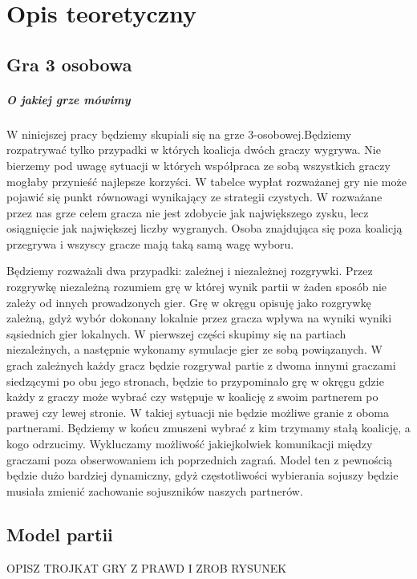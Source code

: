 \chapter{Opis teoretyczny}
\label{cha:opis_teor}

\section{Gra 3 osobowa}
\label{sec:3_gra}

\paragraph{O jakiej grze mówimy}

W niniejszej pracy będziemy skupiali się na grze 3-osobowej.Będziemy rozpatrywać tylko przypadki w których koalicja dwóch graczy wygrywa. Nie bierzemy pod uwagę sytuacji w których współpraca ze sobą wszystkich graczy mogłaby przynieść najlepsze korzyści. W tabelce wypłat rozważanej gry nie może pojawić się punkt równowagi wynikający ze strategii czystych. W rozważane przez nas grze celem gracza nie jest zdobycie jak największego zysku, lecz osiągnięcie jak największej liczby wygranych. Osoba znajdująca się poza koalicją przegrywa i wszyscy gracze mają taką samą wagę wyboru.

Będziemy rozważali dwa przypadki: zależnej i niezależnej rozgrywki. Przez rozgrywkę niezależną rozumiem grę w której wynik partii w żaden sposób nie zależy od innych prowadzonych gier. Grę w okręgu opisuję jako rozgrywkę zależną, gdyż wybór dokonany lokalnie przez gracza wpływa na wyniki wyniki sąsiednich gier lokalnych. W pierwszej części skupimy się na partiach niezależnych, a następnie wykonamy symulacje gier ze sobą powiązanych. W grach zależnych każdy gracz będzie rozgrywał partie z dwoma innymi graczami siedzącymi po obu jego stronach, będzie to przypominało grę w okręgu gdzie każdy z graczy może wybrać czy wstępuje w koalicję z swoim partnerem po prawej czy lewej stronie. W takiej sytuacji nie będzie możliwe granie z oboma partnerami. Będziemy w końcu zmuszeni wybrać z kim trzymamy stałą koalicję, a kogo odrzucimy. Wykluczamy możliwość jakiejkolwiek komunikacji między graczami poza obserwowaniem ich poprzednich zagrań. Model ten z pewnością będzie dużo bardziej dynamiczny, gdyż częstotliwości wybierania sojuszy będzie musiała zmienić zachowanie sojuszników naszych partnerów.

\section{Model partii}
OPISZ TROJKAT GRY Z PRAWD I ZROB RYSUNEK

